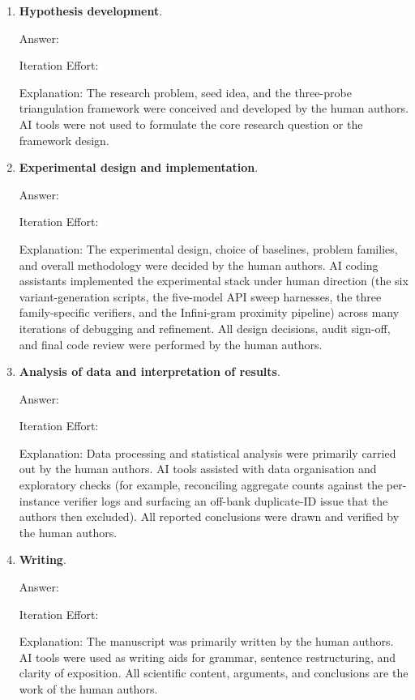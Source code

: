 \begin{enumerate}

  \item \textbf{Hypothesis development}.

  Answer: \involvementA{}

  Iteration Effort: \iterationNA{}

  Explanation: The research problem, seed idea, and the three-probe
  triangulation framework were conceived and developed by the human authors.
  AI tools were not used to formulate the core research question or the
  framework design.

  \item \textbf{Experimental design and implementation}.

  Answer: \involvementB{}

  Iteration Effort: \iterationHigh{}

  Explanation: The experimental design, choice of baselines, problem families,
  and overall methodology were decided by the human authors. AI coding
  assistants implemented the experimental stack under human direction (the six
  variant-generation scripts, the five-model API sweep harnesses, the three
  family-specific verifiers, and the Infini-gram proximity pipeline) across
  many iterations of debugging and refinement. All design decisions, audit
  sign-off, and final code review were performed by the human authors.

  \item \textbf{Analysis of data and interpretation of results}.

  Answer: \involvementB{}

  Iteration Effort: \iterationMedium{}

  Explanation: Data processing and statistical analysis were primarily carried
  out by the human authors. AI tools assisted with data organisation and
  exploratory checks (for example, reconciling aggregate counts against the
  per-instance verifier logs and surfacing an off-bank duplicate-ID issue that
  the authors then excluded). All reported conclusions were drawn and verified
  by the human authors.

  \item \textbf{Writing}.

  Answer: \involvementB{}

  Iteration Effort: \iterationMedium{}

  Explanation: The manuscript was primarily written by the human authors. AI
  tools were used as writing aids for grammar, sentence restructuring, and
  clarity of exposition. All scientific content, arguments, and conclusions are
  the work of the human authors.

\end{enumerate}

